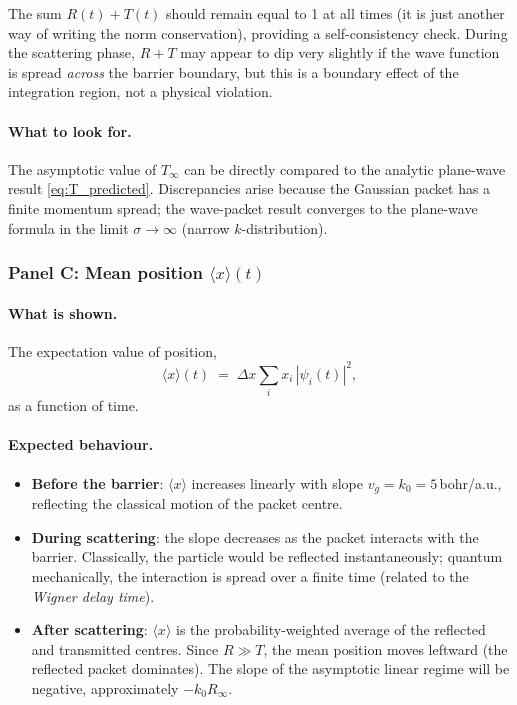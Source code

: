 \documentclass[12pt, a4paper]{article}
\newcommand{\dx}{\Delta x}
\begin{document}
The sum $R(t) + T(t)$ should remain equal to 1 at all times (it is just
another way of writing the norm conservation), providing a self-consistency
check.  During the scattering phase, $R+T$ may appear to dip very slightly
if the wave function is spread \emph{across} the barrier boundary, but
this is a boundary effect of the integration region, not a physical violation.

\paragraph{What to look for.}
The asymptotic value of $T_\infty$ can be directly compared to the
analytic plane-wave result \eqref{eq:T_predicted}.  Discrepancies arise
because the Gaussian packet has a finite momentum spread; the wave-packet
result converges to the plane-wave formula in the limit $\sigma \to \infty$
(narrow $k$-distribution).

\subsubsection{Panel C: Mean position $\langle x \rangle(t)$}

\paragraph{What is shown.}
The expectation value of position,
\begin{equation}
  \langle x\rangle(t) \;=\; \dx\sum_i x_i\,|\psi_i(t)|^2,
\end{equation}
as a function of time.

\paragraph{Expected behaviour.}
\begin{itemize}
  \item \textbf{Before the barrier}: $\langle x\rangle$ increases linearly
        with slope $v_g = k_0 = 5$\,bohr/a.u., reflecting the classical
        motion of the packet centre.

  \item \textbf{During scattering}: the slope decreases as the packet
        interacts with the barrier.  Classically, the particle would be
        reflected instantaneously; quantum mechanically, the interaction is
        spread over a finite time (related to the \emph{Wigner delay time}).

  \item \textbf{After scattering}: $\langle x\rangle$ is the
        probability-weighted average of the reflected and transmitted
        centres.  Since $R \gg T$, the mean position moves leftward (the
        reflected packet dominates).  The slope of the asymptotic linear
        regime will be negative, approximately $-k_0 R_\infty$.
\end{itemize}
\end{document}

